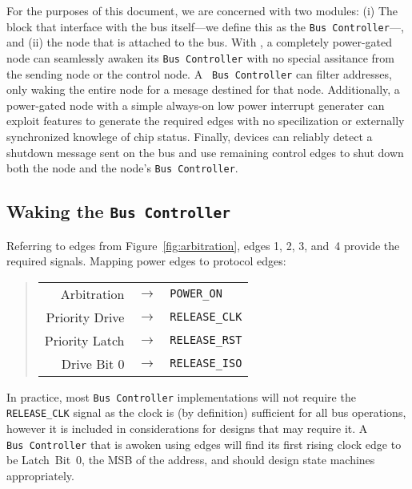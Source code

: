 For the purposes of this document, we are concerned with two modules: (i) The
block that interface with the bus itself---we define this as the {\tt Bus
Controller}---, and (ii) the node that is attached to the bus. With \bus, a
completely power-gated node can seamlessly awaken its {\tt Bus~Controller}
with no special assitance from the sending node or the control node. A {\tt
Bus~Controller} can filter addresses, only waking the entire node for a mesage
destined for that node. Additionally, a power-gated node with a simple
always-on low power interrupt generater can exploit \bus features to generate
the required edges with no specilization or externally synchronized knowlege
of chip status. Finally, devices can reliably detect a shutdown message sent
on the bus and use remaining control edges to shut down both the node and the
node's {\tt Bus~Controller}.

\subsection{Waking the \texttt{Bus~Controller}}
\label{sec:power-bus-controller-wakeup}
Referring to edges from Figure~\ref{fig:arbitration}, edges 1, 2, 3, and~4
provide the required signals. Mapping power edges to \bus protocol edges:

\begin{quote}
\begin{tabular}{r c l}
  Arbitration    & $\rightarrow$ & {\tt POWER\_ON} \\
  Priority Drive & $\rightarrow$ & {\tt RELEASE\_CLK} \\
  Priority Latch & $\rightarrow$ & {\tt RELEASE\_RST} \\
  Drive Bit 0    & $\rightarrow$ & {\tt RELEASE\_ISO} \\
\end{tabular}
\end{quote}

In practice, most {\tt Bus~Controller} implementations will not require the
{\tt RELEASE\_CLK} signal as the \bus clock is (by definition) sufficient for
all bus operations, however it is included in considerations for designs that
may require it. A {\tt Bus~Controller} that is awoken using \bus edges will
find its first rising clock edge to be Latch~Bit~0, the MSB of the address,
and should design state machines appropriately.


